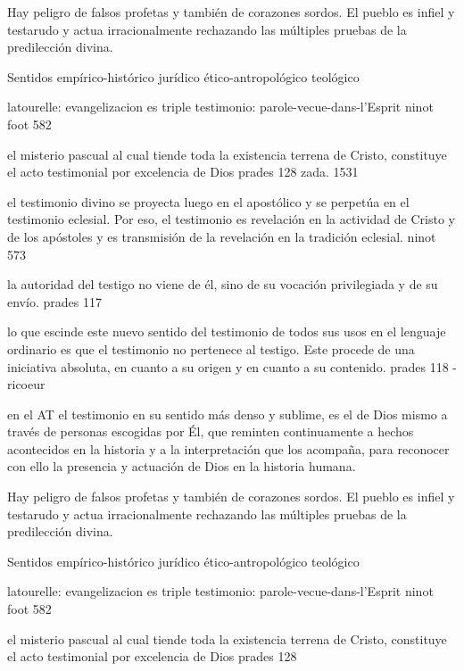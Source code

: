 Hay peligro de falsos profetas y también de corazones sordos.
El pueblo es infiel y testarudo y actua irracionalmente rechazando las múltiples
pruebas de la predilección divina.

Sentidos
empírico-histórico
jurídico
ético-antropológico
teológico

latourelle:
evangelizacion es triple testimonio:
parole-vecue-dans-l'Esprit
ninot foot 582


el misterio pascual al cual tiende toda la existencia terrena de Cristo,
constituye el acto testimonial por excelencia de Dios prades 128 zada. 1531

el testimonio divino se proyecta luego en el apostólico y se perpetúa en el
testimonio eclesial. Por eso, el testimonio es revelación en la actividad de
Cristo y de los apóstoles y es transmisión de la revelación en la tradición
eclesial. ninot 573

la autoridad del testigo no viene de él, sino de su vocación privilegiada y de
su envío. prades 117

lo que escinde este nuevo sentido del testimonio de todos sus usos en el
lenguaje ordinario es que el testimonio no pertenece al testigo. Este procede de
una iniciativa absoluta, en cuanto a su origen y en cuanto a su contenido.
prades 118 - ricoeur

en el AT el testimonio en su sentido más denso y sublime, es el de Dios mismo a
través de personas escogidas por Él, que reminten continuamente a hechos
acontecidos en la historia y a la interpretación que los acompaña, para
reconocer con ello la presencia y actuación de Dios en la historia humana.

Hay peligro de falsos profetas y también de corazones sordos.
El pueblo es infiel y testarudo y actua irracionalmente rechazando las múltiples
pruebas de la predilección divina.

Sentidos
empírico-histórico
jurídico
ético-antropológico
teológico

latourelle:
evangelizacion es triple testimonio:
parole-vecue-dans-l'Esprit
ninot foot 582


el misterio pascual al cual tiende toda la existencia terrena de Cristo,
constituye el acto testimonial por excelencia de Dios prades 128

